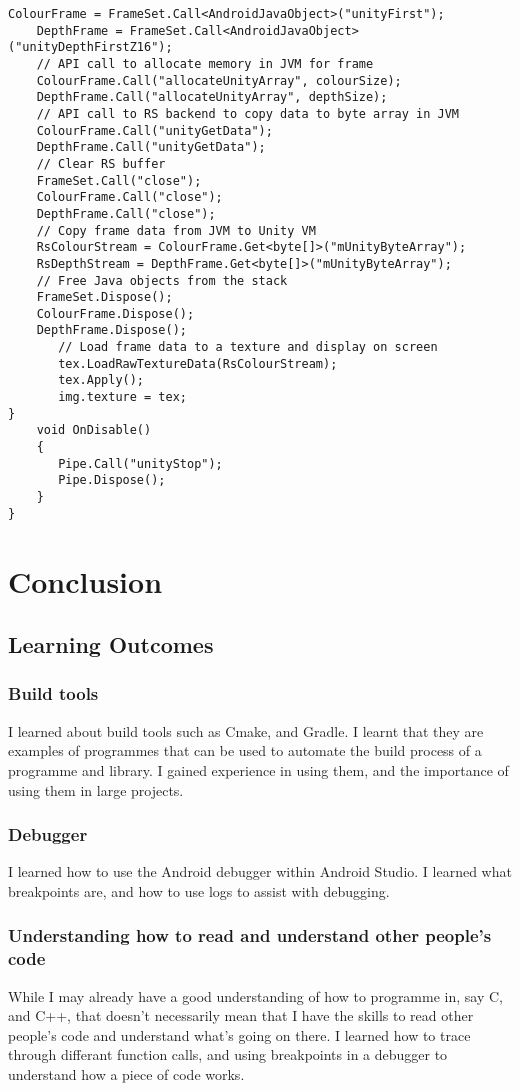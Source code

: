 \begin{lstlisting}[style=CSharpStyle]
    ColourFrame = FrameSet.Call<AndroidJavaObject>("unityFirst");
    DepthFrame = FrameSet.Call<AndroidJavaObject>("unityDepthFirstZ16");
    // API call to allocate memory in JVM for frame
    ColourFrame.Call("allocateUnityArray", colourSize);
    DepthFrame.Call("allocateUnityArray", depthSize);
    // API call to RS backend to copy data to byte array in JVM
    ColourFrame.Call("unityGetData");
    DepthFrame.Call("unityGetData");
    // Clear RS buffer
    FrameSet.Call("close");
    ColourFrame.Call("close");
    DepthFrame.Call("close");
    // Copy frame data from JVM to Unity VM
    RsColourStream = ColourFrame.Get<byte[]>("mUnityByteArray");
    RsDepthStream = DepthFrame.Get<byte[]>("mUnityByteArray");
    // Free Java objects from the stack
    FrameSet.Dispose();
    ColourFrame.Dispose();
    DepthFrame.Dispose();
       // Load frame data to a texture and display on screen
       tex.LoadRawTextureData(RsColourStream);
       tex.Apply();
       img.texture = tex;
}
    void OnDisable()
    {
       Pipe.Call("unityStop");
       Pipe.Dispose();
    }
}\end{lstlisting}        

\section{Conclusion}
    \subsection{Learning Outcomes}
        \subsubsection{Build tools}
        I learned about build tools such as Cmake, and Gradle. I learnt that they are examples of programmes that can be used to automate the build process of a programme and library. I gained experience in using them, and the importance of using them in large projects.
        \subsubsection{Debugger}
        I learned how to use the Android debugger within Android Studio. I learned what breakpoints are, and how to use logs to assist with debugging.
        \subsubsection{Understanding how to read and understand other people's code}
        While I may already have a good understanding of how to programme in, say C, and C++, that doesn't necessarily mean that I have the skills to read other people's code and understand what's going on there. I learned how to trace through differant function calls, and using breakpoints in a debugger to understand how a piece of code works.
